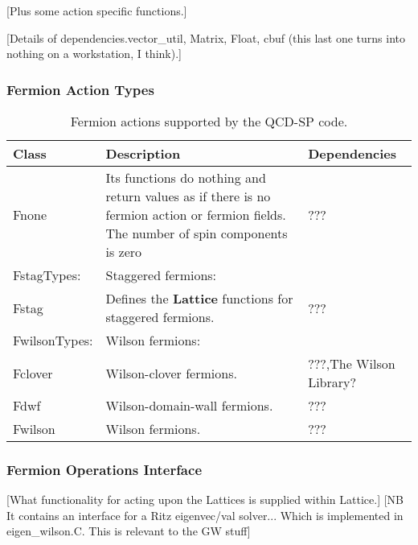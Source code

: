 \documentclass[12pt]{article}
\newcommand{\cls}[1]{{\bf #1}}            %
\begin{document}
[Plus some action specific functions.]

[Details of dependencies.vector\_util, Matrix, Float, cbuf (this last
one turns into nothing on a workstation, I think).]

\subsubsection{Fermion Action Types}

\begin{table}[!ht]
\begin{center}
 \begin{tabular}{lp{100mm}l}
 \hline
 \bf{Class} & \bf{Description} & \bf{Dependencies}\\
 \hline
 Fnone & Its functions do nothing and return values as if there is no
 fermion action or fermion fields. The number of spin components is
 zero & ???\\
 FstagTypes: & Staggered fermions: & \\
 \hspace{5mm}Fstag & Defines the \cls{Lattice} functions for
 staggered fermions. & ???\\
 FwilsonTypes: & Wilson fermions:& \\
 \hspace{5mm}Fclover & Wilson-clover fermions. & ???,The Wilson Library?\\
 \hspace{5mm}Fdwf & Wilson-domain-wall fermions. & ???\\
 \hspace{5mm}Fwilson & Wilson fermions. & ???\\
 \hline
 \end{tabular}
 \label{tab:factions}
 \caption{Fermion actions supported by the QCD-SP code.}
\end{center}
\end{table}

\subsubsection{Fermion Operations Interface}
[What functionality for acting upon the Lattices is supplied within Lattice.]
[NB It contains an interface for a Ritz eigenvec/val solver... Which
is implemented in eigen\_wilson.C.  This is relevant to the GW stuff]
\end{document}
